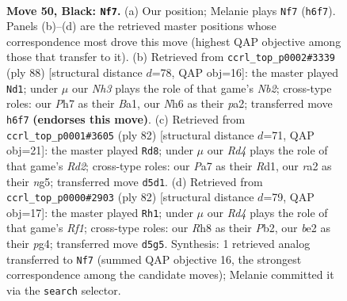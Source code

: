 \documentclass[11pt]{article}
\begin{document}
\clearpage

\begin{figure}[p]\centering
\begin{subfigure}{0.46\textwidth}\centering
\resizebox{\linewidth}{!}{%
\newchessgame
\chessboard[
  setfen={5b1r/p6p/P4k1n/3r4/5B2/1Pp4P/R1P1B1PK/2R5 b - - 8 50},
  showmover=false,
  pgfstyle=straightmove, color=movearrow, markmove={h6-f7}
]}
\caption{}
\end{subfigure}\hfill
\begin{subfigure}{0.46\textwidth}\centering
\resizebox{\linewidth}{!}{%
\newchessgame
\chessboard[
  setfen={8/8/1r2bpk1/4p1pp/8/R5P1/pN1K1P1P/B7 w - - 12 45},
  showmover=false,
  pgfstyle=straightmove, color=movearrow, markmove={b2-d1}
]}
\caption{}
\end{subfigure}
\\[4pt]
\begin{subfigure}{0.46\textwidth}\centering
\resizebox{\linewidth}{!}{%
\newchessgame
\chessboard[
  setfen={5r1k/1r5p/5ppP/1N2p1n1/2B1b3/6P1/3R1P2/3R2K1 w - - 1 42},
  showmover=false,
  pgfstyle=straightmove, color=movearrow, markmove={d2-d8}
]}
\caption{}
\end{subfigure}\hfill
\begin{subfigure}{0.46\textwidth}\centering
\resizebox{\linewidth}{!}{%
\newchessgame
\chessboard[
  setfen={8/1pr2Npk/p1b1B3/5P2/2P1p1pb/8/1P4PK/5R2 w - - 2 42},
  showmover=false,
  pgfstyle=straightmove, color=movearrow, markmove={f1-h1}
]}
\caption{}
\end{subfigure}
\caption{\textbf{Move 50, Black: \texttt{Nf7}.} (a) Our position; Melanie plays \texttt{Nf7} (\texttt{h6f7}). Panels (b)--(d) are the retrieved master positions whose correspondence most drove this move (highest QAP objective among those that transfer to it). (b) Retrieved from \texttt{ccrl\_top\_p0002\#3339} (ply 88) [structural distance $d$=78, QAP obj=16]: the master played \texttt{Nd1}; under $\mu$ our \emph{Nh3} plays the role of that game's \emph{Nb2}; cross-type roles: our \emph{P}h7 as their \emph{B}a1, our \emph{N}h6 as their \emph{p}a2; transferred move \texttt{h6f7} \textbf{(endorses this move)}. (c) Retrieved from \texttt{ccrl\_top\_p0001\#3605} (ply 82) [structural distance $d$=71, QAP obj=21]: the master played \texttt{Rd8}; under $\mu$ our \emph{Rd4} plays the role of that game's \emph{Rd2}; cross-type roles: our \emph{P}a7 as their \emph{R}d1, our \emph{r}a2 as their \emph{n}g5; transferred move \texttt{d5d1}. (d) Retrieved from \texttt{ccrl\_top\_p0000\#2903} (ply 82) [structural distance $d$=79, QAP obj=17]: the master played \texttt{Rh1}; under $\mu$ our \emph{Rd4} plays the role of that game's \emph{Rf1}; cross-type roles: our \emph{R}h8 as their \emph{P}b2, our \emph{b}e2 as their \emph{p}g4; transferred move \texttt{d5g5}. Synthesis: 1 retrieved analog transferred to \texttt{Nf7} (summed QAP objective 16, the strongest correspondence among the candidate moves); Melanie committed it via the \texttt{search} selector.}
\label{fig:thought-m99}
\end{figure}
\end{document}
